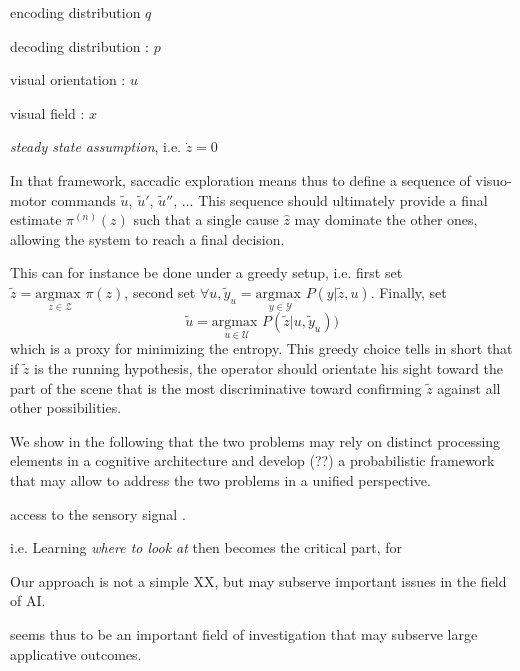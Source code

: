 \documentclass{article} %
\begin{document}
encoding distribution $q$

decoding distribution : $p$

visual orientation : $u$

visual field : $x$

\emph{steady state assumption}, i.e. $\dot{z} = 0$




In that framework, saccadic exploration means thus to define a sequence of visuo-motor commands $\tilde{u}$, $\tilde{u}'$, $\tilde{u}''$, ... This sequence should ultimately provide a final estimate $\pi^{(n)}(z)$ such that a single cause $\hat{z}$ may dominate the other ones, allowing the system to reach a final decision.  

{\color{blue}
	This can for instance be done under a greedy setup, i.e. first set $\tilde{z} = \underset{z \in \mathcal{Z}}{\text{argmax }} \pi(z)$, second set $\forall u, \tilde{y}_u = \underset{y \in \mathcal{Y}}{\text{argmax }} P(y|\tilde{z},u)$.
	Finally, set 
	\begin{equation}
	\tilde{u} = \underset{u \in \mathcal{U}}{\text{argmax }}  P(\tilde{z}|u,\tilde{y}_u))
	\end{equation} which is a proxy for minimizing the entropy. This greedy choice tells in short that if $\tilde{z}$ is the running hypothesis, the operator should orientate his sight toward 
	the part of the scene that is the most discriminative toward confirming $\tilde{z}$ against all other possibilities. }
	
	
	
	
	
	{\color{blue} We show in the following that the two problems may rely on distinct processing elements in a cognitive architecture and develop (??) a probabilistic framework that may allow to address the two problems in a unified perspective. }
	
	access to the sensory signal . 
	
	i.e. Learning \emph{where to look at} then becomes the critical part, for 
	
	Our approach is not a simple XX, but may subserve important issues in the field of AI. 
	
	 seems thus to be an important field of investigation that may subserve large applicative outcomes.  
	
	
\end{document}
